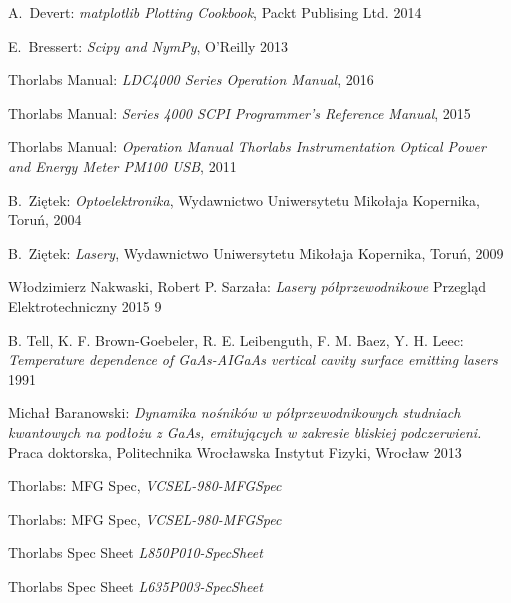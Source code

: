 \begin{thebibliography}{99}
  A.~Devert:
\emph{matplotlib Plotting Cookbook},
Packt Publising Ltd. 2014

 E.~Bressert:
\emph{Scipy and NymPy},
O'Reilly 2013

 Thorlabs Manual:
\emph{LDC4000 Series Operation Manual},
2016

 Thorlabs Manual:
\emph{Series 4000 SCPI Programmer's Reference Manual},
2015

 Thorlabs Manual:
\emph{Operation Manual
Thorlabs Instrumentation Optical Power and Energy Meter PM100 USB},
2011

  B.~Ziętek:
\emph{Optoelektronika},
Wydawnictwo Uniwersytetu Mikołaja Kopernika, Toruń, 2004

  B.~Ziętek:
\emph{Lasery},
Wydawnictwo Uniwersytetu Mikołaja Kopernika, Toruń, 2009

 Włodzimierz Nakwaski, Robert P. Sarzała:
\emph{Lasery półprzewodnikowe}
 Przegląd Elektrotechniczny 2015 9

 B. Tell, K. F. Brown-Goebeler, R. E. Leibenguth, F. M.  Baez, Y. H. Leec:
\emph{Temperature dependence of GaAs-AIGaAs vertical cavity surface emitting lasers }
1991

 Michał Baranowski:
\emph{Dynamika nośników w półprzewodnikowych
studniach kwantowych na podłożu z GaAs, emitujących w zakresie bliskiej podczerwieni.}
Praca doktorska, Politechnika Wrocławska
Instytut Fizyki, Wrocław 2013

 Thorlabs:
MFG Spec,
\emph{VCSEL-980-MFGSpec}

 Thorlabs:
MFG Spec,
\emph{VCSEL-980-MFGSpec}

 Thorlabs
Spec Sheet
\emph{L850P010-SpecSheet}

 Thorlabs
Spec Sheet
\emph{L635P003-SpecSheet}
\end{thebibliography}
